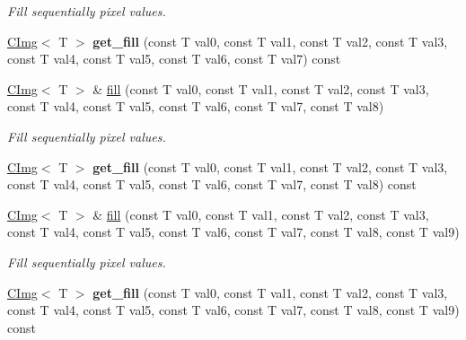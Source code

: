 \begin{DoxyCompactItemize}
\begin{DoxyCompactList}\small\item\em Fill sequentially pixel values. \item\end{DoxyCompactList}\item 
\hypertarget{structcimg__library_1_1CImg_a73343678c416b8b6a1a1c8b65da6d40d}{
\hyperlink{structcimg__library_1_1CImg}{CImg}$<$ T $>$ {\bfseries get\_\-fill} (const T val0, const T val1, const T val2, const T val3, const T val4, const T val5, const T val6, const T val7) const }
\label{structcimg__library_1_1CImg_a73343678c416b8b6a1a1c8b65da6d40d}

\item 
\hypertarget{structcimg__library_1_1CImg_a4ebdf4aa9f4ba2901da7ceb8f167ab7e}{
\hyperlink{structcimg__library_1_1CImg}{CImg}$<$ T $>$ \& \hyperlink{structcimg__library_1_1CImg_a4ebdf4aa9f4ba2901da7ceb8f167ab7e}{fill} (const T val0, const T val1, const T val2, const T val3, const T val4, const T val5, const T val6, const T val7, const T val8)}
\label{structcimg__library_1_1CImg_a4ebdf4aa9f4ba2901da7ceb8f167ab7e}

\begin{DoxyCompactList}\small\item\em Fill sequentially pixel values. \item\end{DoxyCompactList}\item 
\hypertarget{structcimg__library_1_1CImg_a9b85f68b65eef7d282f3e804532a34da}{
\hyperlink{structcimg__library_1_1CImg}{CImg}$<$ T $>$ {\bfseries get\_\-fill} (const T val0, const T val1, const T val2, const T val3, const T val4, const T val5, const T val6, const T val7, const T val8) const }
\label{structcimg__library_1_1CImg_a9b85f68b65eef7d282f3e804532a34da}

\item 
\hypertarget{structcimg__library_1_1CImg_aef066fce13f0bb426791b7a507589c3b}{
\hyperlink{structcimg__library_1_1CImg}{CImg}$<$ T $>$ \& \hyperlink{structcimg__library_1_1CImg_aef066fce13f0bb426791b7a507589c3b}{fill} (const T val0, const T val1, const T val2, const T val3, const T val4, const T val5, const T val6, const T val7, const T val8, const T val9)}
\label{structcimg__library_1_1CImg_aef066fce13f0bb426791b7a507589c3b}

\begin{DoxyCompactList}\small\item\em Fill sequentially pixel values. \item\end{DoxyCompactList}\item 
\hypertarget{structcimg__library_1_1CImg_a5544b158a5a069ed4a315e15c2621f9a}{
\hyperlink{structcimg__library_1_1CImg}{CImg}$<$ T $>$ {\bfseries get\_\-fill} (const T val0, const T val1, const T val2, const T val3, const T val4, const T val5, const T val6, const T val7, const T val8, const T val9) const }
\label{structcimg__library_1_1CImg_a5544b158a5a069ed4a315e15c2621f9a}


\end{DoxyCompactItemize}
